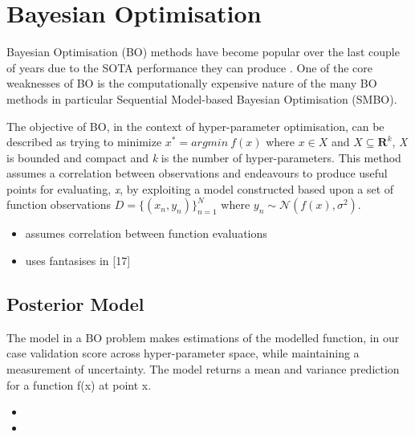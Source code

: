 


\section {Bayesian Optimisation}

	Bayesian Optimisation (BO) methods have become popular over the last couple of years due to the SOTA performance they can produce \cite{32} \cite{20}. One of the core weaknesses of BO is the computationally expensive nature of the many BO methods in particular Sequential Model-based Bayesian Optimisation (SMBO). 

	\par

	The objective of BO, in the context of hyper-parameter optimisation, can be described as trying to minimize \(x^* = argmin~ f(x)\) where \(x \in X\) and \(X \subseteq \mathbf{R} ^k\), \textit{X} is bounded and compact and \textit{k} is the number of hyper-parameters. This method assumes a correlation between observations and endeavours to produce useful points for evaluating, \textit{x}, by exploiting a model constructed based upon a set of function observations \( D = \{(x_n,y_n)\}_{n=1}^N\) where \(y_n \sim \mathcal{N}(f(x), \sigma^2) \).


	\begin{itemize}

	\item assumes correlation between function evaluations

	\item uses fantasises in [17]

	\end{itemize}








	\subsection{Posterior Model}

		The model in a BO problem makes estimations of the modelled function, in our case validation score across hyper-parameter space, while maintaining a measurement of uncertainty. The model returns a mean and variance prediction for a function f(x) at point x. \cite{35} 

		\begin{itemize}

		\item 

		\item 

		\end{itemize}




